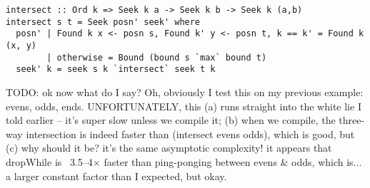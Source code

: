 \documentclass[acmsmall,screen,review,anonymous,dvipsnames,svgnames]{acmart}
\newcommand\todo[1]{{\color{Orange}#1}}
\renewcommand\todo[1]{{\color{IndianRed}#1}}
\begin{document}
\begin{verbatim}
intersect :: Ord k => Seek k a -> Seek k b -> Seek k (a,b)
intersect s t = Seek posn' seek' where
  posn' | Found k x <- posn s, Found k' y <- posn t, k == k' = Found k (x, y)
        | otherwise = Bound (bound s `max` bound t)
  seek' k = seek s k `intersect` seek t k
\end{verbatim}

\noindent
\todo{TODO: ok now what do I say? Oh, obviously I test this on my previous example: evens, odds, ends.
  UNFORTUNATELY, this (a) runs straight into the white lie I told earlier -- it's super slow unless we compile it; (b) when we compile, the three-way intersection is indeed faster than (intersect evens odds), which is good, but (c) why should it be? it's the same asymptotic complexity! it appears that dropWhile is ~3.5--4$\times$ faster than ping-ponging between evens \& odds, which is... a larger constant factor than I expected, but okay.
}







\end{document}
